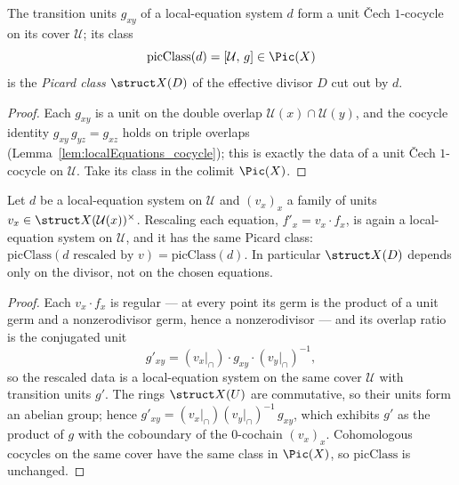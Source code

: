 \begin{definition}
  \label{def:localEquations_picClass}
  \leanok
  The transition units \(g_{xy}\) of a local-equation system \(d\) form a unit \v Cech
  \(1\)-cocycle on its cover \(\mathcal U\); its class
  \[
    \mathrm{picClass}(d) = [\mathcal U,\, g] \in \Pic(X)
  \]
  is the \emph{Picard class} \(\struct X(D)\) of the effective divisor \(D\) cut out by \(d\).
\end{definition}
\begin{proof}
  \leanok
  Each \(g_{xy}\) is a unit on the double overlap \(\mathcal U(x) \cap \mathcal U(y)\), and the
  cocycle identity \(g_{xy}\, g_{yz} = g_{xz}\) holds on triple overlaps
  (Lemma~\ref{lem:localEquations_cocycle}); this is exactly the data of a unit \v Cech
  \(1\)-cocycle on \(\mathcal U\). Take its class in the colimit \(\Pic(X)\).
\end{proof}

\begin{lemma}
  \label{lem:localEquations_rescale}
  \leanok
  Let \(d\) be a local-equation system on \(\mathcal U\) and \((v_x)_x\) a family of units
  \(v_x \in \struct X(\mathcal U(x))^{\times}\). Rescaling each equation, \(f'_x = v_x \cdot f_x\),
  is again a local-equation system on \(\mathcal U\), and it has the same Picard class:
  \(\mathrm{picClass}(d\text{ rescaled by }v) = \mathrm{picClass}(d)\). In particular \(\struct
  X(D)\) depends only on the divisor, not on the chosen equations.
\end{lemma}
\begin{proof}
  \leanok
  Each \(v_x \cdot f_x\) is regular --- at every point its germ is the product of a unit germ and a
  nonzerodivisor germ, hence a nonzerodivisor --- and its overlap ratio is the conjugated unit
  \[
    g'_{xy} = (v_x|_{\cap}) \cdot g_{xy} \cdot (v_y|_{\cap})^{-1},
  \]
  so the rescaled data is a local-equation system on the same cover \(\mathcal U\) with transition
  units \(g'\). The rings \(\struct X(U)\) are commutative, so their units form an abelian group;
  hence \(g'_{xy} = (v_x|_{\cap})(v_y|_{\cap})^{-1}\, g_{xy}\), which exhibits \(g'\) as the product
  of \(g\) with the coboundary of the \(0\)-cochain \((v_x)_x\). Cohomologous cocycles on the same
  cover have the same class in \(\Pic(X)\), so \(\mathrm{picClass}\) is unchanged.
\end{proof}

